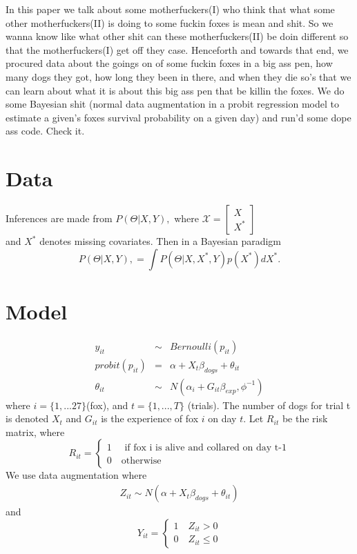 \documentclass[aoas,preprint]{imsart}
\numberwithin{equation}{section}
\theoremstyle{plain}
\begin{document}
In this paper we talk about some motherfuckers(I) who think that what some other motherfuckers(II) is doing to some fuckin foxes is mean and shit. So we wanna know like what other shit can these motherfuckers(II) be doin different so that the motherfuckers(I) get off they case. Henceforth and towards that end, we procured data about the goings on of some fuckin foxes in a big ass pen, how many dogs they got, how long they been in there, and when they die so's that we can learn about what it is about this big ass pen that be killin the foxes. We do some Bayesian shit (normal data augmentation in a probit regression model to estimate a given's foxes survival probability on a given day) and run'd some dope ass code. Check it.

\section{Data}

Inferences are made from $P(\Theta|X,Y),$ where $
	\mathcal{X}=\left[
	\begin{array}{ll}
	X \\
	X^{*} 
	\end{array}
	\right]$ \\and $X^{*}$ denotes missing covariates. Then in a Bayesian paradigm $$P(\Theta|X,Y), = \int P(\Theta|X,X^{*},Y) p(X^{*}) dX^{*}.$$


\section{Model}

\begin{eqnarray}
y_{it} &\sim& Bernoulli(p_{it}) \\
probit(p_{it}) & = & \alpha + X_{t}\beta_{dogs} + \theta_{it} \\
\theta_{it} &\sim& N(\alpha_{i} + G_{it} \beta_{exp}, \phi^{-1})
\end{eqnarray}
where $i = \{1,...27\} $(fox), and $t= \{1,...,T\}$ (trials). The number of dogs for trial t is denoted $X_t$ and $G_{it}$ is the experience of fox $i$ on day $t$. Let $R_{it}$ be the risk matrix, where
\[
    R_{it}=\left\{
                \begin{array}{ll}
                  1 \quad \text{ if fox i is alive and collared on day t-1}\\
                  0 \quad \text{otherwise}
                \end{array}
              \right.
  \]
  We use data augmentation where 
  \begin{eqnarray}
  Z_{it} \sim N( \alpha + X_t\beta_{dogs} +\theta_{it})
  \end{eqnarray}
  and
\[
    Y_{it}=\left\{
                \begin{array}{ll}
                  1 \quad  Z_{it} > 0\\
                  0 \quad Z_{it} \leq 0
                \end{array}
              \right.
  \]
  
\end{document}
